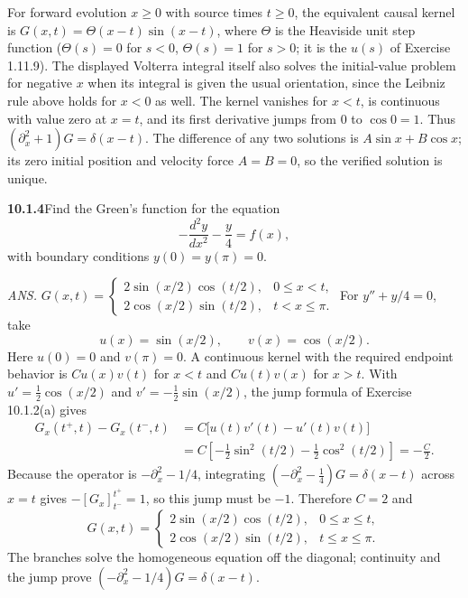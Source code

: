 For forward evolution $x\ge0$ with source times $t\ge0$, the equivalent
causal kernel is $G(x,t)=\Theta(x-t)\sin(x-t)$, where $\Theta$ is the
Heaviside unit step function ($\Theta(s)=0$ for $s<0$, $\Theta(s)=1$ for
$s>0$; it is the $u(s)$ of Exercise 1.11.9).
The displayed Volterra integral itself also solves the initial-value
problem for negative $x$ when its integral is given the usual
orientation, since the Leibniz rule above holds for $x<0$ as well.
The kernel vanishes for $x<t$, is continuous with value zero at
$x=t$, and its first derivative jumps from $0$ to $\cos0=1$.
Thus $(\partial_x^2+1)G=\delta(x-t)$. The difference of any two
solutions is $A\sin x+B\cos x$; its zero initial position and velocity
force $A=B=0$, so the verified solution is unique.

\par\bigskip
\noindent\textbf{10.1.4}\quad Find the Green's function for the equation
\[
-\frac{d^{2}y}{dx^{2}}-\frac{y}{4}=f(x),
\]
with boundary conditions $y(0)=y(\pi)=0$.
\par\nobreak\hfill\emph{ANS.}\enspace
$G(x,t)=\begin{cases}
2\sin(x/2)\cos(t/2), & 0\le x<t,\\
2\cos(x/2)\sin(t/2), & t<x\le\pi.
\end{cases}$
\solution
For $y''+y/4=0$, take
\[
u(x)=\sin(x/2),\qquad v(x)=\cos(x/2).
\]
Here $u(0)=0$ and $v(\pi)=0$. A continuous kernel with the required
endpoint behavior is $C u(x)v(t)$ for $x<t$ and $C u(t)v(x)$ for $x>t$.
With $u'=\frac12\cos(x/2)$ and $v'=-\frac12\sin(x/2)$, the jump formula
of Exercise 10.1.2(a) gives
\begin{align*}
G_x(t^+,t)-G_x(t^-,t)
&=C\bigl[u(t)v'(t)-u'(t)v(t)\bigr]\\
&=C\left[-\frac12\sin^2(t/2)-\frac12\cos^2(t/2)\right]
=-\frac C2.
\end{align*}
Because the operator is $-\partial_x^2-1/4$, integrating
$(-\partial_x^2-\frac14)G=\delta(x-t)$ across $x=t$ gives
$-[G_x]_{t^-}^{t^+}=1$, so this jump must be $-1$.
Therefore $C=2$ and
\[
\boxed{G(x,t)=\begin{cases}
2\sin(x/2)\cos(t/2),&0\le x\le t,\\
2\cos(x/2)\sin(t/2),&t\le x\le\pi.
\end{cases}}
\]
The branches solve the homogeneous equation off the diagonal; continuity
and the jump prove $(-\partial_x^2-1/4)G=\delta(x-t)$.

